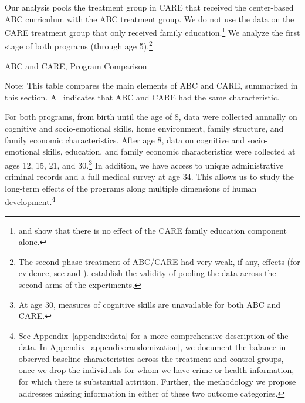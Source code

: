 Our analysis pools the treatment group in CARE that received the center-based ABC curriculum with the ABC treatment group. We do not use the data on the CARE treatment group that only received family education.\footnote{\citet{Campbell_Conti_etal_2014_EarlyChildhoodInvestments} and \citet{ABCCARE_Dataset} show that there is no effect of the CARE family education component alone.} We analyze the first stage of both programs (through age 5).\footnote{The second-phase treatment of ABC/CARE had very weak, if any, effects (for evidence, see \citealp{Campbell_Conti_etal_2014_EarlyChildhoodInvestments} and \citealp{ABCCARE_Dataset}). \citet{Campbell_Conti_etal_2014_EarlyChildhoodInvestments} establish the validity of pooling the data across the second arms of the experiments.}

\begin{table}[!htbp]
\centering
\caption{ABC and CARE, Program Comparison} \label{tab:programcomparison}
\begin{adjustbox}{max width=\textwidth}
\begin{threeparttable}
	\small
	
\begin{tablenotes}
\small
\item Note: This table compares the main elements of ABC and CARE, summarized in this section. A \checkmark\ indicates that ABC and CARE had the same characteristic.
\end{tablenotes}
\end{threeparttable}
\end{adjustbox}
\end{table}

For both programs, from birth until the age of 8, data were collected annually on cognitive and socio-emotional skills, home environment, family structure, and family economic characteristics. After age 8, data on cognitive and socio-emotional skills, education, and family economic characteristics were collected at ages 12, 15, 21, and 30.\footnote{At age 30, measures of cognitive skills are unavailable for both ABC and CARE.} In addition, we have access to unique administrative criminal records and a full medical survey at age 34. This allows us to study the long-term effects of the programs along multiple dimensions of human development.\footnote{See Appendix~\ref{appendix:data} for a more comprehensive description of the data. In Appendix~\ref{appendix:randomization}, we document the balance in observed baseline characteristics across the treatment and control groups, once we drop the individuals for whom we have crime or health information, for which there is substantial attrition. Further, the methodology we propose addresses missing information in either of these two outcome categories.}

